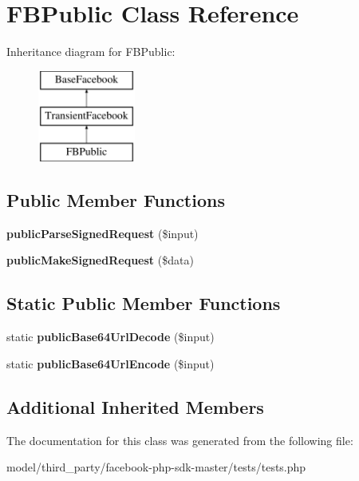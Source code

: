 \hypertarget{classFBPublic}{\section{F\-B\-Public Class Reference}
\label{classFBPublic}
}
Inheritance diagram for F\-B\-Public\-:\begin{figure}[H]
\begin{center}
\leavevmode
\includegraphics[height=3.000000cm]{classFBPublic}
\end{center}
\end{figure}
\subsection*{Public Member Functions}
\begin{DoxyCompactItemize}
\item 
\hypertarget{classFBPublic_a5aa7376607b3460d5a1a3cdbd9c63d98}{{\bfseries public\-Parse\-Signed\-Request} (\$input)}\label{classFBPublic_a5aa7376607b3460d5a1a3cdbd9c63d98}

\item 
\hypertarget{classFBPublic_a48bb7d662d76648df19e2bdc2ab02487}{{\bfseries public\-Make\-Signed\-Request} (\$data)}\label{classFBPublic_a48bb7d662d76648df19e2bdc2ab02487}

\end{DoxyCompactItemize}
\subsection*{Static Public Member Functions}
\begin{DoxyCompactItemize}
\item 
\hypertarget{classFBPublic_a355256ea41cd8312f2e9b7e29a8bb89d}{static {\bfseries public\-Base64\-Url\-Decode} (\$input)}\label{classFBPublic_a355256ea41cd8312f2e9b7e29a8bb89d}

\item 
\hypertarget{classFBPublic_aad76f4246afe534ae6caf1a8ac7c670f}{static {\bfseries public\-Base64\-Url\-Encode} (\$input)}\label{classFBPublic_aad76f4246afe534ae6caf1a8ac7c670f}

\end{DoxyCompactItemize}
\subsection*{Additional Inherited Members}


The documentation for this class was generated from the following file\-:\begin{DoxyCompactItemize}
\item 
model/third\-\_\-party/facebook-\/php-\/sdk-\/master/tests/tests.\-php\end{DoxyCompactItemize}
